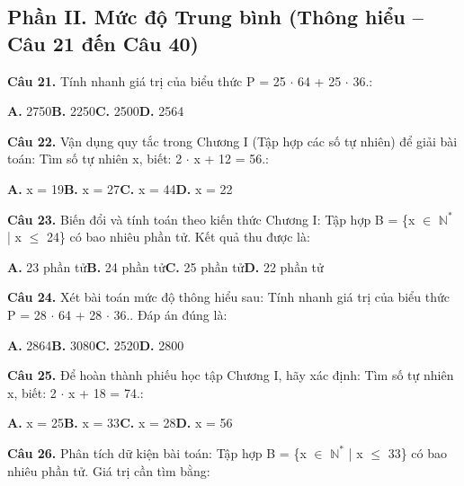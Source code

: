 \documentclass[11pt,a4paper]{article}
\begin{document}
\subsection*{\color{accent} Phần II. Mức độ Trung bình (Thông hiểu -- Câu 21 đến Câu 40)}
\textbf{\color{primary} Câu 21.} Tính nhanh giá trị của biểu thức P = 25 $\cdot$ 64 + 25 $\cdot$ 36.:\par
\hspace*{1.5em}\textbf{A.} 2750\quad\quad \textbf{B.} 2250\quad\quad \textbf{C.} 2500\quad\quad \textbf{D.} 2564\par\vspace{2pt}
\textbf{\color{primary} Câu 22.} Vận dụng quy tắc trong Chương I (Tập hợp các số tự nhiên) để giải bài toán: Tìm số tự nhiên x, biết: 2 $\cdot$ x + 12 = 56.:\par
\hspace*{1.5em}\textbf{A.} x = 19\quad\quad \textbf{B.} x = 27\quad\quad \textbf{C.} x = 44\quad\quad \textbf{D.} x = 22\par\vspace{2pt}
\textbf{\color{primary} Câu 23.} Biến đổi và tính toán theo kiến thức Chương I: Tập hợp B = \{x $\in$ $\mathbb{N}^*$ | x $\le$ 24\} có bao nhiêu phần tử. Kết quả thu được là:\par
\hspace*{1.5em}\textbf{A.} 23 phần tử\quad\quad \textbf{B.} 24 phần tử\quad\quad \textbf{C.} 25 phần tử\quad\quad \textbf{D.} 22 phần tử\par\vspace{2pt}
\textbf{\color{primary} Câu 24.} Xét bài toán mức độ thông hiểu sau: Tính nhanh giá trị của biểu thức P = 28 $\cdot$ 64 + 28 $\cdot$ 36.. Đáp án đúng là:\par
\hspace*{1.5em}\textbf{A.} 2864\quad\quad \textbf{B.} 3080\quad\quad \textbf{C.} 2520\quad\quad \textbf{D.} 2800\par\vspace{2pt}
\textbf{\color{primary} Câu 25.} Để hoàn thành phiếu học tập Chương I, hãy xác định: Tìm số tự nhiên x, biết: 2 $\cdot$ x + 18 = 74.:\par
\hspace*{1.5em}\textbf{A.} x = 25\quad\quad \textbf{B.} x = 33\quad\quad \textbf{C.} x = 28\quad\quad \textbf{D.} x = 56\par\vspace{2pt}
\textbf{\color{primary} Câu 26.} Phân tích dữ kiện bài toán: Tập hợp B = \{x $\in$ $\mathbb{N}^*$ | x $\le$ 33\} có bao nhiêu phần tử. Giá trị cần tìm bằng:\par
\end{document}
